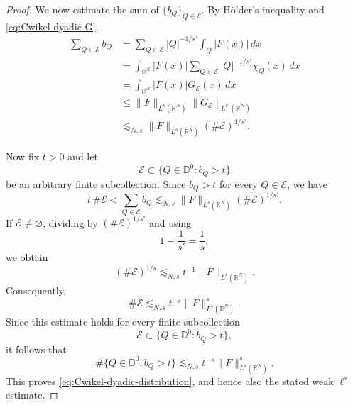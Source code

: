 \documentclass[12pt]{amsart}
\begin{document}
\begin{proof}
We now estimate the sum of $\{b_Q\}_{Q\in\mathcal E}$. By
H\"older's inequality and \eqref{eq:Cwikel-dyadic-G},
\begin{align*}
\sum_{Q\in\mathcal E}b_Q
&=
\sum_{Q\in\mathcal E}
|Q|^{-1/s'}
\int_Q|F(x)|\,dx
\\
&=
\int_{\mathbb R^N}
|F(x)|
\sum_{Q\in\mathcal E}
|Q|^{-1/s'}\chi_Q(x)\,dx
\\
&=
\int_{\mathbb R^N}
|F(x)|G_{\mathcal E}(x)\,dx
\\
&\leq
\|F\|_{L^s(\mathbb R^N)}
\|G_{\mathcal E}\|_{L^{s'}(\mathbb R^N)}
\\
&\lesssim_{N,s}
\|F\|_{L^s(\mathbb R^N)}
(\#\mathcal E)^{1/s'}.
\end{align*}

Now fix $t>0$ and let
\[
\mathcal E
\subset
\{Q\in\mathbb D^0:b_Q>t\}
\]
be an arbitrary finite subcollection. Since $b_Q>t$ for every
$Q\in\mathcal E$, we have
\[
t\,\#\mathcal E
<
\sum_{Q\in\mathcal E}b_Q
\lesssim_{N,s}
\|F\|_{L^s(\mathbb R^N)}
(\#\mathcal E)^{1/s'}.
\]
If $\mathcal E\neq\varnothing$, dividing by
$(\#\mathcal E)^{1/s'}$ and using
\[
1-\frac1{s'}=\frac1s,
\]
we obtain
\[
(\#\mathcal E)^{1/s}
\lesssim_{N,s}
t^{-1}\|F\|_{L^s(\mathbb R^N)}.
\]
Consequently,
\[
\#\mathcal E
\lesssim_{N,s}
t^{-s}\|F\|_{L^s(\mathbb R^N)}^s.
\]
Since this estimate holds for every finite subcollection
\[
\mathcal E
\subset
\{Q\in\mathbb D^0:b_Q>t\},
\]
it follows that
\[
\#\bigl\{Q\in\mathbb D^0:b_Q>t\bigr\}
\lesssim_{N,s}
t^{-s}\|F\|_{L^s(\mathbb R^N)}^s.
\]
This proves \eqref{eq:Cwikel-dyadic-distribution}, and hence also the
stated weak $\ell^s$ estimate.
\end{proof}
\end{document}
